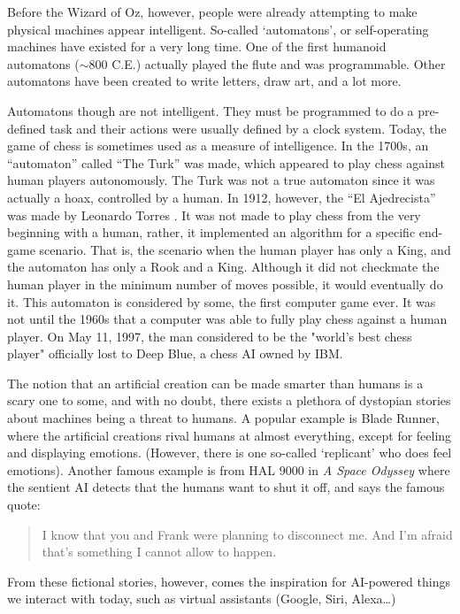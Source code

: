 \documentclass[letterpaper,12pt]{article}
\begin{document}
Before the Wizard of Oz, however, people were already attempting to make physical machines
appear intelligent. So-called `automatons', or self-operating machines have existed for
a very long time. One of the first humanoid automatons ($\sim$800 C.E.) actually played the flute and was programmable.\cite{automaton}
Other automatons have been created to write letters, draw art, and a lot more.

Automatons though are not intelligent.
They must be programmed to do a pre-defined task and their actions were
usually defined by a clock system.
Today, the game of chess is sometimes used as a measure of intelligence.
In the 1700s, an ``automaton'' called ``The Turk'' was made, which appeared to play chess
against human players autonomously\cite{turk}. The Turk was not a true automaton since
it was actually a hoax, controlled by a human. In 1912, however, the ``El Ajedrecista''
was made by Leonardo Torres \cite{actualchessmachine}. It was not made to play chess from the
very beginning with a human, rather, it implemented an algorithm for a
specific end-game scenario. That is, the scenario when the human player has
only a King, and the automaton has only a Rook and a King. Although it did not
checkmate the human player in the minimum number of moves possible, it would
eventually do it.
This automaton is considered by some, the first computer game ever.
It was not until the 1960s that a computer was able to fully play chess against a human player.\cite{computerchess}
On May 11, 1997, the man considered to be the "world's best chess player" officially lost to Deep Blue,
a chess AI owned by IBM.\cite{computerchess}


The notion that an artificial creation can be made smarter than humans is a scary one to some,
and with no doubt, there exists a plethora of dystopian stories about machines being a threat to humans.
A popular example is Blade Runner, where the artificial creations rival humans
at almost everything, except for feeling and displaying emotions. (However, there is one so-called `replicant'
who does feel emotions)\cite{bladerunner}. Another famous example is from HAL 9000 in \textit{A Space Odyssey}
where the sentient AI detects that the humans want to shut it off, and says the
famous quote\cite{HAL}: 
\begin{quote}
   I know that you and Frank were planning to disconnect me. And I'm afraid that's something I cannot allow to happen.
\end{quote}

From these fictional stories, however, comes the inspiration for AI-powered things we interact with
today, such as virtual assistants (Google, Siri, Alexa\dots) 
\end{document}
